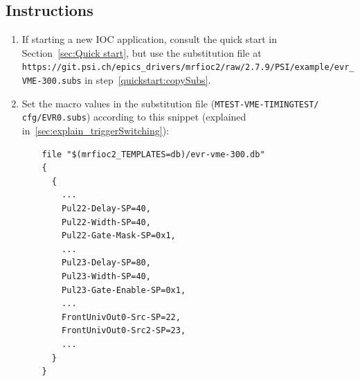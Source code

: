 \documentclass[12pt,a4paper]{article}
\newcommand{\latestDriverVersion}{2.7.9}
\begin{document}
\subsection{Instructions}\label{sec:instructions_triggerSwitching}
\begin{enumerate}
	\item If starting a new IOC application, consult the quick start in Section~\ref{sec:Quick start}, but use the substitution file at \texttt{https://git.psi.ch/epics\_drivers/}\newline \texttt{mrfioc2/raw/\latestDriverVersion/PSI/example/evr\_VME-300.subs} in step~\ref{quickstart:copySubs}. 

	\item \label{sec:gating_instructions1_setMacro} Set the macro values in the substitution file (\texttt{MTEST-VME-TIMINGTEST/} \texttt{cfg/EVR0.subs}) according to this snippet (explained in~\ref{sec:explain_triggerSwitching}):
\begin{verbatim}
	file "$(mrfioc2_TEMPLATES=db)/evr-vme-300.db"
	{
	  {
	    ...
	    Pul22-Delay-SP=40,
	    Pul22-Width-SP=40,
	    Pul22-Gate-Mask-SP=0x1,
	    ...
	    Pul23-Delay-SP=80,
	    Pul23-Width-SP=40,
	    Pul23-Gate-Enable-SP=0x1,
	    ...
	    FrontUnivOut0-Src-SP=22,
	    FrontUnivOut0-Src2-SP=23,
	    ...
	  }
	}


\end{verbatim}
\end{enumerate}
\end{document}
